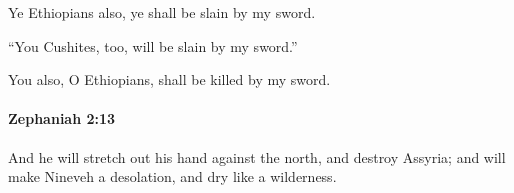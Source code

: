 			\begin{versebox}
					\item[BHS] 
					\item[LXX] 
					\item[ASV] Ye Ethiopians also, ye shall be slain by my sword.
					\item[NIV] “You Cushites, too, will be slain by my sword.”
					\item[NRSV] You also, O Ethiopians, shall be killed by my sword.
			\end{versebox}

		\paragraph{Zephaniah 2:13} %
			\label{ZEPHANIAH-2-13}

			And he will stretch out his hand against the north, and destroy Assyria; and will make Nineveh a desolation, and dry like a wilderness.

